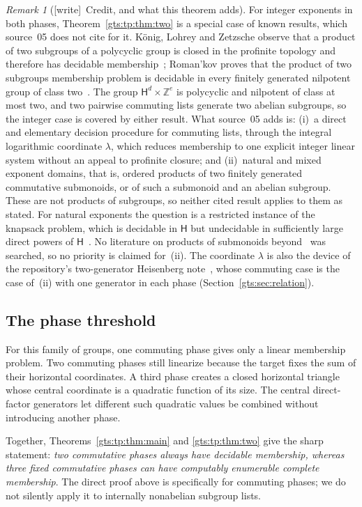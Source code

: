\documentclass[11pt,letterpaper]{article}
\theoremstyle{definition}
\theoremstyle{remark}
\newtheorem{remark}[theorem]{Remark}
\newcommand{\ZZ}{\mathbb Z}
\newcommand{\HH}{\mathsf H}
\newcommand{\wtag}{\textup{[write]}}
\begin{document}
\begin{remark}[\wtag\ Credit, and what this theorem adds]\label{gts:tp:rem:credit}
For integer exponents in both phases, Theorem~\ref{gts:tp:thm:two} is a special case of known results, which source~05 does not cite for it. K\"onig, Lohrey and Zetzsche observe that a product of two subgroups of a polycyclic group is closed in the profinite topology and therefore has decidable membership~\cite[Remark~6.7]{KLZ}; Roman'kov proves that the product of two subgroups membership problem is decidable in every finitely generated nilpotent group of class two~\cite{Romankov}. The group $\HH^d\times\ZZ^e$ is polycyclic and nilpotent of class at most two, and two pairwise commuting lists generate two abelian subgroups, so the integer case is covered by either result. What source~05 adds is: (i)~a direct and elementary decision procedure for commuting lists, through the integral logarithmic coordinate $\lambda$, which reduces membership to one explicit integer linear system without an appeal to profinite closure; and (ii)~natural and mixed exponent domains, that is, ordered products of two finitely generated commutative submonoids, or of such a submonoid and an abelian subgroup. These are not products of subgroups, so neither cited result applies to them as stated. For natural exponents the question is a restricted instance of the knapsack problem, which is decidable in $\HH$ but undecidable in sufficiently large direct powers of $\HH$~\cite{KLZ}. No literature on products of submonoids beyond~\cite{KLZ,Romankov} was searched, so no priority is claimed for~(ii). The coordinate $\lambda$ is also the device of the repository's two-generator Heisenberg note~\cite{repo-heis}, whose commuting case is the case of~(ii) with one generator in each phase (Section~\ref{gts:sec:relation}).
\end{remark}

\subsection{The phase threshold}
For this family of groups, one commuting phase gives only a linear
membership problem. Two commuting phases still linearize because the target
fixes the sum of their horizontal coordinates. A third phase creates a
closed horizontal triangle whose central coordinate is a quadratic
function of its size. The central direct-factor generators let different
such quadratic values be combined without introducing another phase.

Together, Theorems~\ref{gts:tp:thm:main} and \ref{gts:tp:thm:two} give the sharp statement:
\emph{two commutative phases always have decidable membership, whereas three
fixed commutative phases can have computably enumerable complete
membership}. The direct proof above is specifically for commuting phases;
we do not silently apply it to internally nonabelian subgroup lists.
\end{document}
